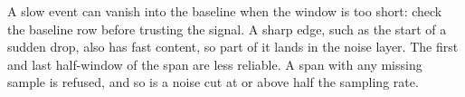 A slow event can vanish into the baseline when the window is too short: check the baseline
row before trusting the signal. A sharp edge, such as the start of a sudden drop, also has
fast content, so part of it lands in the noise layer. The first and last half-window of the
span are less reliable. A span with any missing sample is refused, and so is a noise cut at or
above half the sampling rate.
